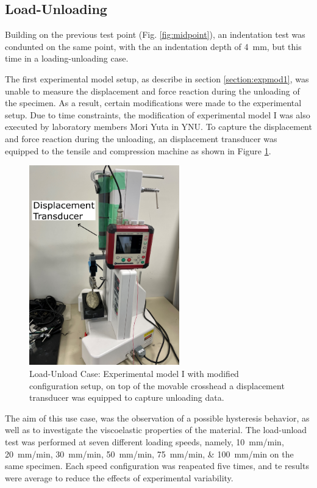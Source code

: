 \subsection{Load-Unloading}
\label{subsection:loadunload}
Building on the previous test point (Fig. \ref{fig:midpoint}), an indentation
 test was condunted on the same point, with the an indentation depth of 
 \SI{4}{\milli \m}, but this time in a loading-unloading case.

The first experimental model setup, as describe in section \ref{section:expmod1},
was unable to measure the displacement and force reaction during the unloading 
of the specimen. As a result, certain modifications were made to the experimental 
setup. Due to time constraints, the modification of experimental model I 
was also executed by laboratory members Mori Yuta in YNU.
To capture the displacement and force reaction during the unloading, an 
displacement transducer was equipped to the tensile and compression machine 
as shown in Figure \ref{fig:unloadingexp1}.

\begin{figure}%
    \centering
   \quad
   \includegraphics[width=6.5cm]{Images/Experiment/unloading.png}%
   \caption{Load-Unload Case: Experimental model I with modified configuration setup, on top of the movable crosshead a displacement transducer was equipped to capture unloading data.}%
   \label{fig:unloadingexp1}%
\end{figure}
 
The aim of this use case, was the observation of a possible hysteresis
behavior, as well as to investigate the viscoelastic properties of the material.
The load-unload test was performed at seven different loading speeds, namely, 
\SIlist[per-mode = symbol]{10;20;30;50;75;100}{\milli \metre \per \minute} on the 
same specimen.
Each speed configuration was reapeated five times, and te results were average to 
reduce the effects of experimental variability.\\


